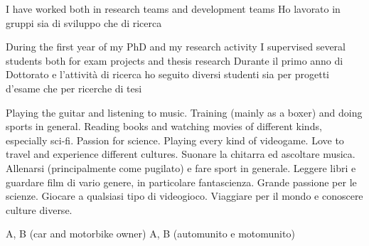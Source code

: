 {  %
  \personalSkills

    
    \communicationSkills
      {I have worked both in research teams and development teams}
      {Ho lavorato in gruppi sia di sviluppo che di ricerca}
    
    \organisationalSkills
      {During the first year of my PhD and my research activity I supervised several students both for exam projects and thesis research}
      {Durante il primo anno di Dottorato e l'attività di ricerca ho seguito diversi studenti sia per progetti d'esame che per ricerche di tesi}
      
    \computerSkills
      {}
      {}
      
    \otherSkills
      {Playing the guitar and listening to music. Training (mainly as a boxer) and doing sports in general. Reading books and watching movies of different kinds, especially sci-fi. Passion for science. Playing every kind of videogame. Love to travel and experience different cultures.}
      {Suonare la chitarra ed ascoltare musica. Allenarsi (principalmente come pugilato) e fare sport in generale. Leggere libri e guardare film di vario genere, in particolare fantascienza. Grande passione per le scienze. Giocare a qualsiasi tipo di videogioco. Viaggiare per il mondo e conoscere culture diverse.}
      
    \drivingLicence
      {A, B (car and motorbike owner)}
      {A, B (automunito e motomunito)}


}
